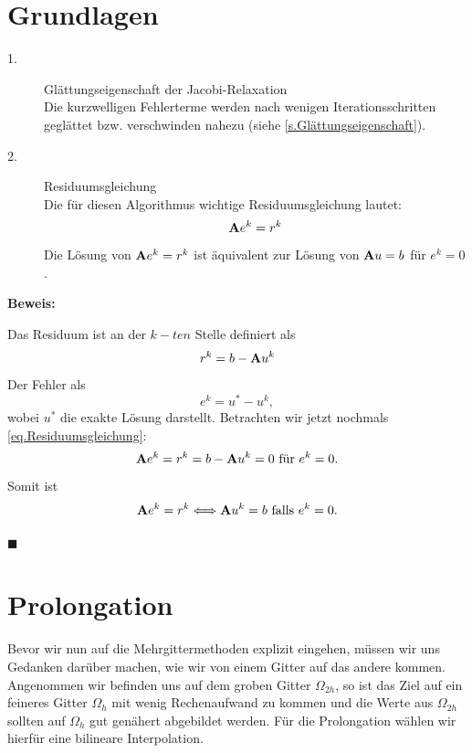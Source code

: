 \section{Grundlagen}\label{s.Idee MGM}

\begin{description}

\item[1.] Glättungseigenschaft der Jacobi-Relaxation \\
Die kurzwelligen Fehlerterme werden nach wenigen Iterationsschritten geglättet bzw. verschwinden nahezu (siehe \autoref{s.Glättungseigenschaft}).
\item[2.] Residuumsgleichung \\
Die für diesen Algorithmus wichtige Residuumsgleichung lautet:
\begin{equation}
{\textbf{A}} e^{k} = r^{k}
\end{equation}
Die Lösung von ${\textbf{A}} e^{k} = r^{k}$ ist äquivalent zur Lösung von ${\textbf{A}}u=b$ für $e^{k} = 0$.

\end{description}

\textbf{Beweis:}

Das Residuum ist an der $k-ten$ Stelle definiert als 
\begin{equation}
r^{k} = b - {\textbf{A}}u^{k}
\end{equation}
Der Fehler als
\begin{equation}
e^{k} = u^{*} - u^{k},
\end{equation}
wobei $u^{*}$ die exakte Lösung darstellt.
Betrachten wir jetzt nochmals \autoref{eq.Residuumsgleichung}:
\begin{equation}
{\textbf{A}}e^{k} = r^{k} = b - {\textbf{A}}u^{k} = 0 \textnormal{ für } e^{k} = 0.
\end{equation}
Somit ist
\begin{equation}
{\textbf{A}}e^{k} = r^{k} \Longleftrightarrow {\textbf{A}}u^{k} = b \textnormal{ falls } e^{k} = 0.
\end{equation}
\begin{flushright}
$\blacksquare$
\end{flushright}

\section{Prolongation}

Bevor wir nun auf die Mehrgittermethoden explizit eingehen, müssen wir uns Gedanken darüber machen, wie wir von einem Gitter auf das andere kommen. Angenommen wir befinden uns auf dem groben Gitter $\Omega_{2h}$, so ist das Ziel auf ein feineres Gitter $\Omega_{h}$ mit wenig Rechenaufwand zu kommen und die Werte aus $\Omega_{2h}$ sollten auf $\Omega_{h}$ gut genähert abgebildet werden. Für die Prolongation wählen wir hierfür eine bilineare Interpolation.


